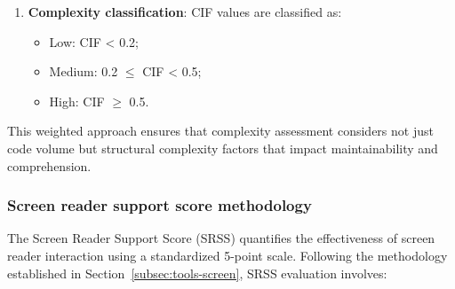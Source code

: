 \begin{enumerate}
    \item \textbf{Complexity classification}: CIF values are classified as:
    \begin{itemize}
        \item Low: CIF < 0.2;
        \item Medium: 0.2 $\leq$ CIF < 0.5;
        \item High: CIF $\geq$ 0.5.
    \end{itemize}
\end{enumerate}

This weighted approach ensures that complexity assessment considers not just code volume but structural complexity factors that impact maintainability and comprehension.

\subsubsection{Screen reader support score methodology}
\label{subsubsec:srss-methodology}

The Screen Reader Support Score (SRSS) quantifies the effectiveness of screen reader interaction using a standardized 5-point scale. Following the methodology established in Section~\ref{subsec:tools-screen}, SRSS evaluation involves:

